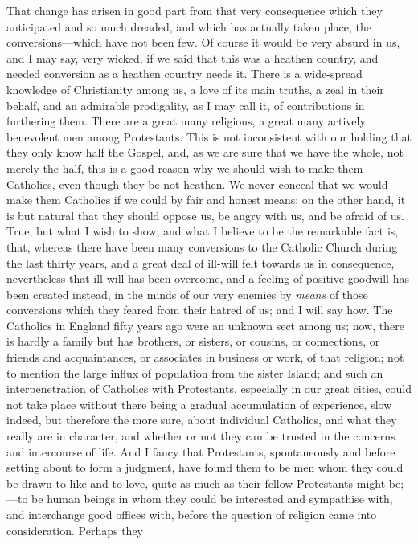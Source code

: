 That change has arisen in good part from that very consequence
which they anticipated and so much dreaded, and which has actually
taken place, the conversions—which have not been few. Of
course it would be very absurd in us, and I may say, very wicked, if
we said that this was a heathen country, and needed conversion as a
heathen country needs it. There is a wide-spread knowledge of
Christianity among us, a love of its main truths, a zeal in their
behalf, and an admirable prodigality, as I may call it, of
contributions in furthering them. There are a great many religious, a
great many actively benevolent men among Protestants. This is not
inconsistent with our holding that they only know half the Gospel,
and, as we are sure that we have the whole, not merely the half, this
is a good reason why we should wish to make them Catholics, even
though they be not heathen. We never conceal that we would make them
Catholics if we could by fair and honest means; on the other hand, it
is but natural that they should oppose us, be angry with us, and be
afraid of us. True, but what I wish to show, and what I believe to be
the remarkable fact is, that, whereas there have been many conversions
to the Catholic Church during the last thirty years, and a great deal
of ill-will felt towards us in consequence, nevertheless that ill-will
has been overcome, and a feeling of positive goodwill has been created
instead, in the minds of our very enemies by \emph{means} of those
conversions which they feared from their hatred of us; and I will say
how. The Catholics in England fifty years ago were an unknown sect
among us; now, there is hardly a family but has brothers, or sisters,
or cousins, or connections, or friends and acquaintances, or
associates in business or work, of that religion; not to mention the
large influx of population from the sister Island; and such an
interpenetration of Catholics with Protestants, especially in our
great cities, could not take place without there being a gradual
accumulation of experience, slow indeed, but therefore the more sure,
about individual Catholics, and what they really are in character, and
whether or not they can be trusted in the concerns and intercourse of
life. And I fancy that Protestants, spontaneously and before setting
about to form a judgment, have found them to be men whom they could be
drawn to like and to love, quite as much as their fellow
Protestants might be;—to be human beings in whom they could be
interested and sympathise with, and interchange good offices with,
before the question of religion came into consideration. Perhaps they
